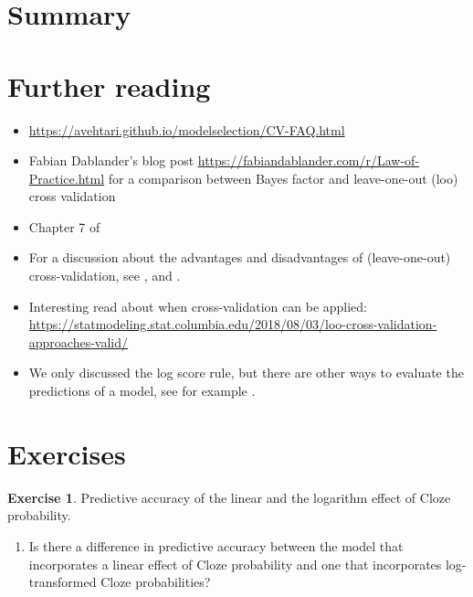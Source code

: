 \documentclass[12pt,]{krantz}
\providecommand{\tightlist}{%
  \setlength{\itemsep}{0pt}\setlength{\parskip}{0pt}}
\theoremstyle{definition}
\theoremstyle{definition}
\theoremstyle{definition}
\newtheorem{exercise}{Exercise}[chapter]
\theoremstyle{remark}
\begin{document}
\hypertarget{summary-5}{%
\section{Summary}\label{summary-5}}

\hypertarget{further-reading-7}{%
\section{Further reading}\label{further-reading-7}}

\begin{itemize}
\tightlist
\item
  \url{https://avehtari.github.io/modelselection/CV-FAQ.html}
\item
  Fabian Dablander's blog post \url{https://fabiandablander.com/r/Law-of-Practice.html} for a comparison between Bayes factor and leave-one-out (loo) cross validation
\item
  Chapter 7 of \citet{Gelman14}
\item
  For a discussion about the advantages and disadvantages of (leave-one-out) cross-validation, see \citet{gronauLimitationsBayesianLeaveOneOut2018}, \citet{vehtariLimitationsLimitationsBayesian2019} and \citet{gronauRejoinderMoreLimitations}.
\item
  Interesting read about when cross-validation can be applied: \url{https://statmodeling.stat.columbia.edu/2018/08/03/loo-cross-validation-approaches-valid/}
\item
  We only discussed the log score rule, but there are other ways to evaluate the predictions of a model, see for example \citet{GneitingRaftery2007}.
\end{itemize}

\hypertarget{exercises-6}{%
\section{Exercises}\label{exercises-6}}

\begin{exercise}
\protect\hypertarget{exr:logcv}{}{\label{exr:logcv} }Predictive accuracy of the linear and the logarithm effect of Cloze probability.
\end{exercise}

\begin{enumerate}
\def\labelenumi{\alph{enumi}.}
\tightlist
\item
  Is there a difference in predictive accuracy between the model that incorporates a linear effect of Cloze probability and one that incorporates log-transformed Cloze probabilities?
\end{enumerate}
\end{document}
